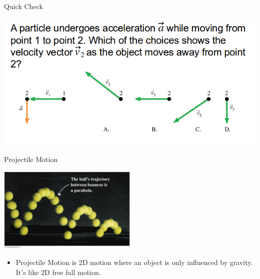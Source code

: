 \documentclass{beamer}
\newcommand{\red}[1]{{\color{red}{#1}}}
\newcommand{\checkh}[2]{\begin{textblock*}{1cm}(#1,#2){\huge \red{\Checkmark}}\end{textblock*}}
\begin{document}
\begin{frame}{Quick Check}
\begin{center}
   \includegraphics[width=\textwidth]{../figures/QC4_1.png}
\end{center}
\only<2>{\checkh{9.0cm}{6.8cm}}
\end{frame}

\begin{frame}{Projectile Motion}
\begin{center}
   \includegraphics[width=0.5\textwidth]{../figures/parabola.jpg}
\end{center}
\begin{itemize}
   \item Projectile Motion is 2D motion where an object is only influenced by gravity. It's like 2D free fall motion.
\end{itemize}
\end{frame}
\end{document}
